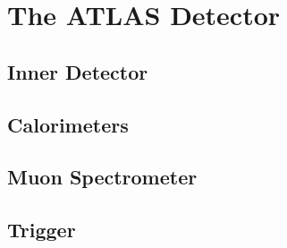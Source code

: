 \chapter{The ATLAS Detector}
\label{sec:atlas}



\cite{ATLAS}


\section{Inner Detector}
\label{sec:atlas_id}
\section{Calorimeters }
\section{Muon Spectrometer}
\section{Trigger}

